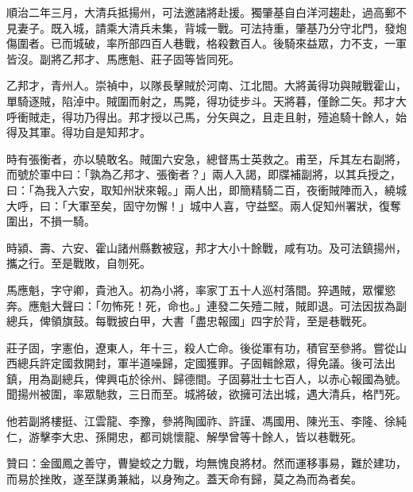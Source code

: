 \begin{pinyinscope}
順治二年三月，大清兵抵揚州，可法邀諸將赴援。獨肇基自白洋河趨赴，過高郵不見妻子。既入城，請乘大清兵未集，背城一戰。可法持重，肇基乃分守北門，發炮傷圍者。已而城破，率所部四百人巷戰，格殺數百人。後騎來益眾，力不支，一軍皆沒。副將乙邦才、馬應魁、莊子固等皆同死。

乙邦才，青州人。崇禎中，以隊長擊賊於河南、江北間。大將黃得功與賊戰霍山，單騎逐賊，陷淖中。賊圍而射之，馬斃，得功徒步斗。天將暮，僅餘二矢。邦才大呼衝賊走，得功乃得出。邦才授以己馬，分矢與之，且走且射，殪追騎十餘人，始得及其軍。得功自是知邦才。

時有張衡者，亦以驍敢名。賊圍六安急，總督馬士英救之。甫至，斥其左右副將，而號於軍中曰：「孰為乙邦才、張衡者？」兩人入謁，即牒補副將，以其兵授之，曰：「為我入六安，取知州狀來報。」兩人出，即簡精騎二百，夜衝賊陣而入，繞城大呼，曰：「大軍至矣，固守勿懈！」城中人喜，守益堅。兩人促知州署狀，復奪圍出，不損一騎。

時潁、壽、六安、霍山諸州縣數被寇，邦才大小十餘戰，咸有功。及可法鎮揚州，攜之行。至是戰敗，自刎死。

馬應魁，字守卿，貴池入。初為小將，率家丁五十人巡村落間。猝遇賊，眾懼慾奔。應魁大聲曰：「勿怖死！死，命也。」連發二矢殪二賊，賊即退。可法因拔為副總兵，俾領旗鼓。每戰披白甲，大書「盡忠報國」四字於背，至是巷戰死。

莊子固，字憲伯，遼東人，年十三，殺人亡命。後從軍有功，積官至參將。嘗從山西總兵許定國救開封，軍半道噪歸，定國獲罪。子固輯餘眾，得免議。後可法出鎮，用為副總兵，俾興屯於徐州、歸德間。子固募壯士七百人，以赤心報國為號。聞揚州被圍，率眾馳救，三日而至。城將破，欲擁可法出城，遇大清兵，格鬥死。

他若副將樓挺、江雲龍、李豫，參將陶國祚、許謹、馮國用、陳光玉、李隆、徐純仁，游擊李大忠、孫開忠，都司姚懷龍、解學曾等十餘人，皆以巷戰死。

贊曰：金國鳳之善守，曹變蛟之力戰，均無愧良將材。然而運移事易，難於建功，而易於挫敗，遂至謀勇兼絀，以身殉之。蓋天命有歸，莫之為而為者矣。


\end{pinyinscope}